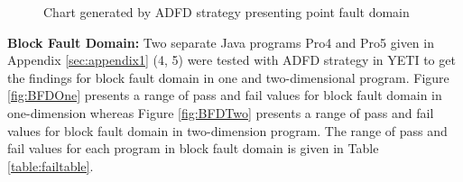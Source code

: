 \begin{figure} [H]
\centering
{}

\bigskip
{}
\bigskip
\caption{Chart generated by ADFD strategy presenting point fault domain}
\end{figure}
\bigskip


\newpage
\noindent \textbf{Block Fault Domain:}  Two separate Java programs Pro4 and Pro5 given in Appendix \ref{sec:appendix1} (4, 5) were tested with ADFD strategy in YETI to get the findings for block fault domain in one and two-dimensional program. Figure \ref{fig:BFDOne} presents a range of pass and fail values for block fault domain in one-dimension whereas Figure \ref{fig:BFDTwo} presents a range of pass and fail values for block fault domain in two-dimension program. The range of pass and fail values for each program in block fault domain is given in Table \ref{table:failtable}.





